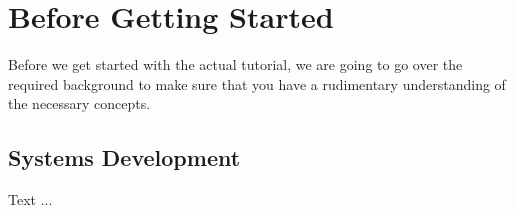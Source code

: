 \section{Before Getting Started}
\label{tutorial_05}

Before we get started with the actual tutorial, we are going to go over the required background to make sure that you have a rudimentary understanding of the necessary concepts.


\subsection{Systems Development}

Text ...
